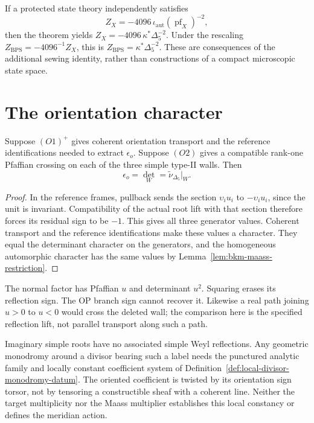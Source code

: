 If a protected state theory independently satisfies
\[
 Z_X=-4096\,
 \iota_{\mathrm{aut}}(\operatorname{pf}_X)^{-2},
\]
then the theorem yields
\(Z_X=-4096\,\kappa^*\Delta_5^{-2}\).
Under the rescaling \(Z_{\mathrm{BPS}}=-4096^{-1}Z_X\), this is
\(Z_{\mathrm{BPS}}=\kappa^*\Delta_5^{-2}\).
These are consequences of the additional sewing identity, rather
than constructions of a compact microscopic state space.

\section{The orientation character}
\label{sec:ch6-orientation-character}

\begin{theorem}
\label{thm:ch6-orientation-character}
Suppose \((O1)^+\) gives coherent orientation transport and the
reference identifications needed to extract \(\epsilon_o\).
Suppose \((O2)\) gives a compatible rank-one Pfaffian crossing on
each of the three simple type-II walls.  Then
\[
 \epsilon_o=\det_W
 =\widetilde\nu_{\Delta_5}|_W.
\]
\end{theorem}
\begin{proof}
In the reference frames, pullback sends the section
\(\upsilon_i u_i\) to \(-\upsilon_i u_i\), since the unit is
invariant.  Compatibility of the actual root lift with that section
therefore forces its residual sign to be \(-1\).  This gives all
three generator values.
Coherent transport and the reference identifications make these
values a character.  They equal the determinant character on the
generators, and the homogeneous automorphic character has the same
values by Lemma~\ref{lem:bkm-maass-restriction}.
\end{proof}

\begin{remark}
\label{rmk:ch6-op-not-orientation-source}
The normal factor has Pfaffian \(u\) and determinant \(u^2\).
Squaring erases its reflection sign.  The OP branch sign cannot
recover it.  Likewise a real path joining \(u>0\) to \(u<0\)
would cross the deleted wall; the comparison here is the specified
reflection lift, not parallel transport along such a path.
\end{remark}

\begin{remark}
\label{rmk:ch6-imaginary-roots}
Imaginary simple roots have no associated simple Weyl reflections.
Any geometric monodromy around a divisor bearing such a label needs
the punctured analytic family and locally constant coefficient
system of Definition~\ref{def:local-divisor-monodromy-datum}.
The oriented coefficient is twisted by its orientation sign torsor,
not by tensoring a constructible sheaf with a coherent line.
Neither the target multiplicity nor the Maass multiplier establishes
this local constancy or defines the meridian action.
\end{remark}

